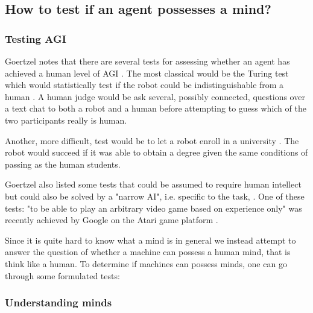 \documentclass[11pt]{article}
\newenvironment{sketch}{\color{dark-green-2}}{\ignorespacesafterend}
\newenvironment{draft}{\color{dark-cornflower-blue-2}}{\ignorespacesafterend}
\begin{document}
\subsection{How to test if an agent possesses a mind?}

\subsubsection*{Testing AGI}
\begin{draft}
Goertzel notes that there are several tests for assessing whether an agent has achieved a human level of AGI \cite{goertzel2012agi}. The most classical would be the Turing test which would statistically test if the robot could be indistinguishable from a human \cite{turing1950computing}. A human judge would be ask several, possibly connected, questions over a text chat to both a robot and a human before attempting to guess which of the two participants really is human.

Another, more difficult, test would be to let a robot enroll in a university \cite{goertzel2012agi}. The robot would succeed if it was able to obtain a degree given the same conditions of passing as the human students.

Goertzel also listed some tests that could be assumed to require human intellect but could also be solved by a "narrow AI", i.e. specific to the task, \cite{goertzel2012agi}. One of these tests: "to be able to play an arbitrary video game based on experience only" was recently achieved by Google on the Atari game platform \cite{googleAtari}.
\end{draft}

\begin{sketch}
Since it is quite hard to know what a mind is in general we instead attempt to answer the question of whether a machine can possess a human mind, that is think like a human. To determine if machines can possess minds, one can go through some formulated tests:
\end{sketch}

\subsubsection*{Understanding minds}
\end{document}
